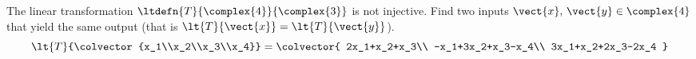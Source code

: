 The linear transformation $\ltdefn{T}{\complex{4}}{\complex{3}}$ is not injective.  Find two inputs $\vect{x},\,\vect{y}\in\complex{4}$ that yield the same output (that is $\lt{T}{\vect{x}}=\lt{T}{\vect{y}}$).
%
\begin{equation*}
\lt{T}{\colvector{x_1\\x_2\\x_3\\x_4}}=
\colvector{
2x_1+x_2+x_3\\
-x_1+3x_2+x_3-x_4\\
3x_1+x_2+2x_3-2x_4
}
\end{equation*}